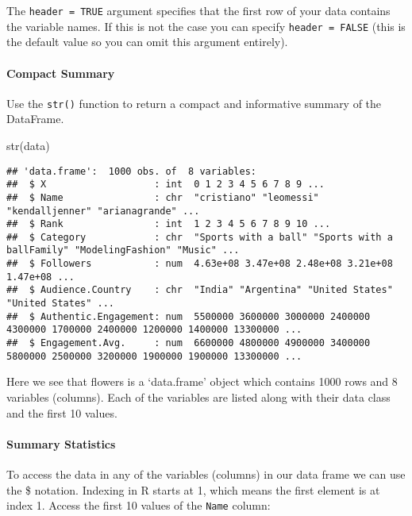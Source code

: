\documentclass[
]{article}
\newenvironment{Shaded}{\begin{snugshade}}{\end{snugshade}}
\newcommand{\FunctionTok}[1]{\textcolor[rgb]{0.00,0.00,0.00}{#1}}
\newcommand{\NormalTok}[1]{#1}
\begin{document}
The \texttt{header\ =\ TRUE} argument specifies that the first row of
your data contains the variable names. If this is not the case you can
specify \texttt{header\ =\ FALSE} (this is the default value so you can
omit this argument entirely).

\hypertarget{compact-summary}{%
\paragraph{Compact Summary}\label{compact-summary}}

Use the \texttt{str()} function to return a compact and informative
summary of the DataFrame.

\begin{Shaded}
\begin{Highlighting}[]
\FunctionTok{str}\NormalTok{(data) }
\end{Highlighting}
\end{Shaded}

\begin{verbatim}
## 'data.frame':  1000 obs. of  8 variables:
##  $ X                   : int  0 1 2 3 4 5 6 7 8 9 ...
##  $ Name                : chr  "cristiano" "leomessi" "kendalljenner" "arianagrande" ...
##  $ Rank                : int  1 2 3 4 5 6 7 8 9 10 ...
##  $ Category            : chr  "Sports with a ball" "Sports with a ballFamily" "ModelingFashion" "Music" ...
##  $ Followers           : num  4.63e+08 3.47e+08 2.48e+08 3.21e+08 1.47e+08 ...
##  $ Audience.Country    : chr  "India" "Argentina" "United States" "United States" ...
##  $ Authentic.Engagement: num  5500000 3600000 3000000 2400000 4300000 1700000 2400000 1200000 1400000 13300000 ...
##  $ Engagement.Avg.     : num  6600000 4800000 4900000 3400000 5800000 2500000 3200000 1900000 1900000 13300000 ...
\end{verbatim}

Here we see that flowers is a `data.frame' object which contains 1000
rows and 8 variables (columns). Each of the variables are listed along
with their data class and the first 10 values.

\hypertarget{summary-statistics}{%
\paragraph{Summary Statistics}\label{summary-statistics}}

To access the data in any of the variables (columns) in our data frame
we can use the \$ notation. Indexing in R starts at 1, which means the
first element is at index 1. Access the first 10 values of the
\texttt{Name} column:
\end{document}
